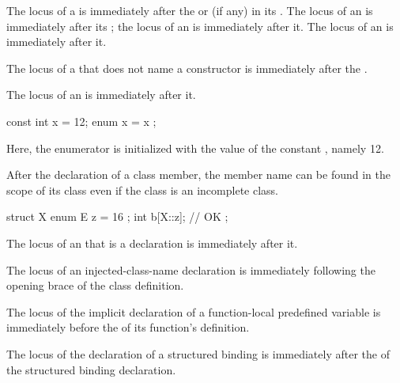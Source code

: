 \pnum
The locus of a  is immediately after
the  or  (if any)
in its .
The locus of an 
is immediately after
its ;
the locus of an 
is immediately after it.
The locus of an  is immediately after it.

\pnum
The locus of a 
that does not name a constructor
is immediately after the .

\pnum
The locus of an  is immediately after it.
\begin{example}
\begin{codeblock}
const int x = 12;
{ enum { x = x }; }
\end{codeblock}
Here, the enumerator  is initialized with the value of the
constant , namely 12.
\end{example}

\pnum
\begin{note}
%
After the declaration of a class member,
the member name can be found in the scope of its class
even if the class is an incomplete class.
\begin{example}
\begin{codeblock}
struct X {
  enum E { z = 16 };
  int b[X::z];          // OK
};
\end{codeblock}
\end{example}
\end{note}

\pnum
The locus of an 
that is a declaration is immediately after it.

\pnum
The locus of an injected-class-name declaration
is immediately following the opening brace of the class definition.

\pnum
The locus of the implicit declaration of
a function-local predefined variable
is immediately before
the  of its function's definition.

\pnum
The locus of the declaration of a structured binding
is immediately after
the  of the structured binding declaration.

